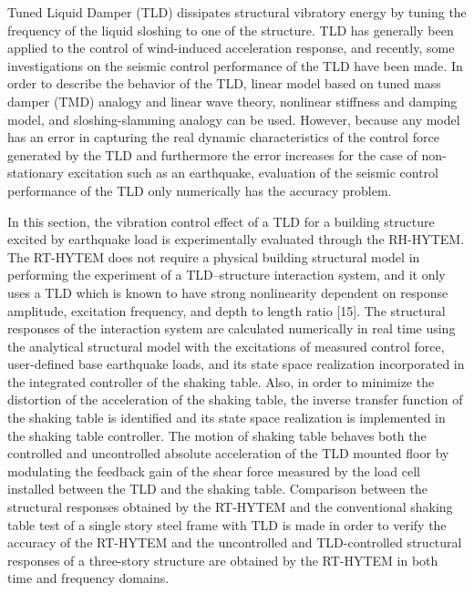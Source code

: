Tuned Liquid Damper (TLD) dissipates structural vibratory energy by tuning the frequency of the liquid sloshing to one of the structure\citep{soong1997passive}. TLD has generally been applied to the control of wind-induced acceleration response\citep{chang1998unified}, and recently, some investigations on the seismic control performance of the TLD have been made\citep{banerji2000tuned}. In order to describe the behavior of the TLD, linear model based on tuned mass damper (TMD) analogy\citep{sun1995properties} and linear wave theory, nonlinear stiffness and damping model\citep{yu1999non}, and sloshing-slamming analogy\citep{yalla2001liquid} can be used. However, because any model has an error in capturing the real dynamic characteristics of the control force generated by the TLD and furthermore the error increases for the case of non-stationary excitation such as an earthquake, evaluation of the seismic control performance of the TLD only numerically has the accuracy problem.

In this section, the vibration control effect of a TLD for a building structure excited by earthquake load is experimentally evaluated through the RH-HYTEM. The RT-HYTEM does not require a physical building structural model in performing the experiment of a TLD–structure interaction system, and it only uses a TLD which is known to have strong nonlinearity dependent on response amplitude, excitation frequency, and depth to length ratio [15]. The structural responses of the interaction system are calculated numerically in real time using the analytical structural model with the excitations of measured control force, user-defined base earthquake loads, and its state space realization incorporated in the integrated controller of the shaking table. Also, in order to minimize the distortion of the acceleration of the shaking table, the inverse transfer function of the shaking table is identified and its state space realization is implemented in the shaking table controller. The motion of shaking table behaves both the controlled and uncontrolled absolute acceleration of the TLD mounted floor by modulating the feedback gain of the shear force measured by the load cell installed between the TLD and the shaking table. Comparison between the structural responses obtained by the RT-HYTEM and the conventional shaking table test of a single story steel frame with TLD is made in order to verify the accuracy of the RT-HYTEM and the uncontrolled and TLD-controlled structural responses of a three-story structure are obtained by the RT-HYTEM in both time and frequency domains.

